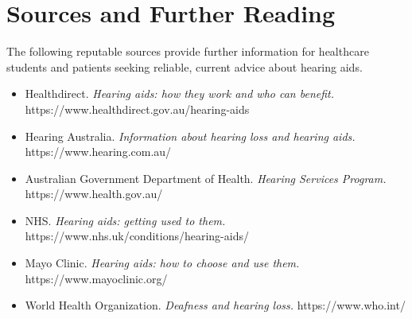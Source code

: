 \section*{Sources and Further Reading}
The following reputable sources provide further information for healthcare students and patients seeking reliable, current advice about hearing aids.

\begin{itemize}
    \item Healthdirect. \textit{Hearing aids: how they work and who can benefit.} https://www.healthdirect.gov.au/hearing-aids
    \item Hearing Australia. \textit{Information about hearing loss and hearing aids.} https://www.hearing.com.au/
    \item Australian Government Department of Health. \textit{Hearing Services Program.} https://www.health.gov.au/
    \item NHS. \textit{Hearing aids: getting used to them.} https://www.nhs.uk/conditions/hearing-aids/
    \item Mayo Clinic. \textit{Hearing aids: how to choose and use them.} https://www.mayoclinic.org/
    \item World Health Organization. \textit{Deafness and hearing loss.} https://www.who.int/
\end{itemize}
